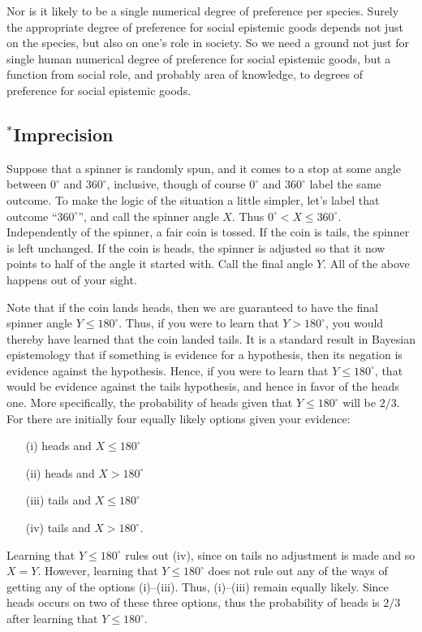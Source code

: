 Nor is it likely to be a single numerical degree of preference per species. Surely the appropriate degree of preference for social epistemic 
goods depends not just on the species, but also on one's role in society. So we need a ground not just for single human numerical degree of
preference for social epistemic goods, but a function from social role, and probably area of knowledge, to degrees of preference for
social epistemic goods.

\subsection{$^*$Imprecision}
Suppose that a spinner is randomly spun, and it comes to a stop at some angle between $0^\circ$ and $360^\circ$, inclusive,
though of course $0^\circ$ and $360^\circ$ label the same outcome. To make the logic of the situation a little simpler, 
let's label that outcome ``$360^\circ$'', and call the spinner angle $X$. Thus $0^\circ < X \le 360^\circ$.
Independently of the spinner, a fair coin is tossed. If the coin is tails, the spinner is left
unchanged. If the coin is heads, the spinner is adjusted so that it now points to half of the angle it started with. Call the 
final angle $Y$. All of the above happens out of your sight.

Note that if the coin lands heads, then we are guaranteed to have the final spinner angle $Y \le 180^\circ$. Thus, if you were
to learn that $Y>180^\circ$, you would thereby have learned that the coin landed tails. It is a standard result in Bayesian
epistemology that if something is evidence for a hypothesis, then its negation is evidence against the hypothesis. Hence, if
you were to learn that $Y \le 180^\circ$, that would be evidence against the tails hypothesis, and hence in favor of the heads
one. More specifically, the probability of heads given that $Y\le 180^\circ$ will be $2/3$. For there are initially four equally
likely options given your evidence: 
\begin{enumerate}
\item[(i)] heads and $X\le 180^\circ$
\item[(ii)] heads and $X> 180^\circ$
\item[(iii)] tails and $X\le 180^\circ$
\item[(iv)] tails and $X> 180^\circ$.
\end{enumerate}
Learning that $Y\le 180^\circ$ rules out (iv), since on tails no adjustment is made and so $X=Y$. However, learning that
$Y\le 180^\circ$ does not rule out any of the ways of getting any of the options (i)--(iii). Thus, (i)--(iii) remain equally
likely. Since heads occurs on two of these three options, thus the probability of heads is $2/3$ after learning that $Y\le 180^\circ$.

